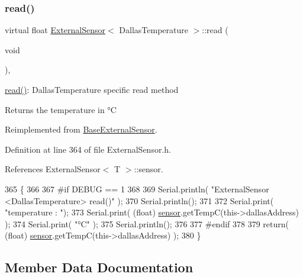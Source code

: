 \subsubsection{\texorpdfstring{read()}{read()}}
{\footnotesize\ttfamily virtual float \hyperlink{classExternalSensor}{External\+Sensor}$<$ Dallas\+Temperature $>$\+::read (\begin{DoxyParamCaption}\item[{void}]{ }\end{DoxyParamCaption})\hspace{0.3cm}{\ttfamily [inline]}, {\ttfamily [virtual]}}

\hyperlink{classExternalSensor_3_01DallasTemperature_01_4_a1e725d9338314515d4e5dc456ed6a6c8}{read()}\+: Dallas\+Temperature specific read method

\begin{DoxyReturn}{Returns}
the temperature in °C 
\end{DoxyReturn}


Reimplemented from \hyperlink{classBaseExternalSensor_a1564f16deacf57b51b9948ac29db4291}{Base\+External\+Sensor}.



Definition at line 364 of file External\+Sensor.\+h.



References External\+Sensor$<$ T $>$\+::sensor.


\begin{DoxyCode}
365     \{
366     
367 \textcolor{preprocessor}{    #if DEBUG == 1 }
368 
369         Serial.println( \textcolor{stringliteral}{"ExternalSensor <DallasTemperature> read()"} );
370         Serial.println();
371 
372         Serial.print( \textcolor{stringliteral}{"temperature : "});
373         Serial.print( (\textcolor{keywordtype}{float}) \hyperlink{classExternalSensor_3_01DallasTemperature_01_4_adb6ba4fcdedef95ad8f6b0c9b6c0f9d1}{sensor}.getTempC(this->dallasAddress) );
374         Serial.print( \textcolor{stringliteral}{"°C"} );
375         Serial.println();
376     
377 \textcolor{preprocessor}{    #endif}
378         
379         \textcolor{keywordflow}{return}( (\textcolor{keywordtype}{float}) \hyperlink{classExternalSensor_3_01DallasTemperature_01_4_adb6ba4fcdedef95ad8f6b0c9b6c0f9d1}{sensor}.getTempC(this->dallasAddress) );
380     \}
\end{DoxyCode}


\subsection{Member Data Documentation}
\mbox{\label{classExternalSensor_3_01DallasTemperature_01_4_a7d9e9d2893e453638fcf440e5d8d9082}} 
